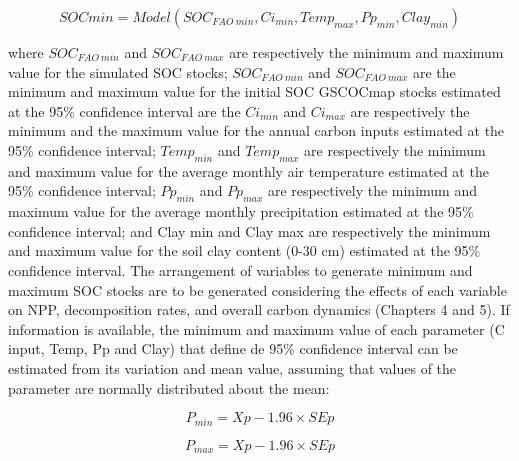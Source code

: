 \documentclass[
  10pt,
  b5paper,
]{book}
\begin{document}
\begin{equation}
\tag{12.4}
  SOC min = Model(SOC_{FAO \ min}, Ci_{min}, Temp_{max}, Pp_{min}, Clay_{min})          
\end{equation}

where \(SOC_{FAO \ min}\) and \(SOC_{FAO \ max}\) are respectively the minimum and maximum value for the simulated SOC stocks; \(SOC_{FAO \ min}\) and \(SOC_{FAO \ max}\) are the minimum and maximum value for the initial SOC GSCOCmap stocks estimated at the 95\% confidence interval are the \(Ci_{min}\) and \(Ci_{max}\) are respectively the minimum and the maximum value for the annual carbon inputs estimated at the 95\% confidence interval; \(Temp_{min}\) and \(Temp_{max}\) are respectively the minimum and maximum value for the average monthly air temperature estimated at the 95\% confidence interval; \(Pp_{min}\) and \(Pp_{max}\) are respectively the minimum and maximum value for the average monthly precipitation estimated at the 95\% confidence interval; and Clay min and Clay max are respectively the minimum and maximum value for the soil clay content (0-30 cm) estimated at the 95\% confidence interval. The arrangement of variables to generate minimum and maximum SOC stocks are to be generated considering the effects of each variable on NPP, decomposition rates, and overall carbon dynamics (Chapters 4 and 5).
If information is available, the minimum and maximum value of each parameter (C input, Temp, Pp and Clay) that define de 95\% confidence interval can be estimated from its variation and mean value, assuming that values of the parameter are normally distributed about the mean:

\begin{equation}
\tag{12.5}
P_{min} = Xp - 1.96 \times SEp 
\end{equation}

\begin{equation}
\tag{12.6}
P_{max} = Xp - 1.96 \times SEp 
\end{equation}
\end{document}

